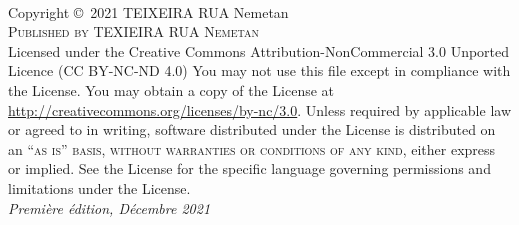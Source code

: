 \documentclass[11pt,fleqn]{book} %
\begin{document}

\begingroup
\thispagestyle{empty} %
\vfill
\endgroup


\newpage
~\vfill
\thispagestyle{empty}

\noindent Copyright \copyright\ 2021 TEIXEIRA RUA Nemetan\\ %

\noindent \textsc{Published by TEXIEIRA RUA Nemetan}\\ %


\noindent Licensed under the Creative Commons Attribution-NonCommercial 3.0 Unported Licence (CC BY-NC-ND 4.0) You may not use this file except in compliance with the License. You may obtain a copy of the License at \url{http://creativecommons.org/licenses/by-nc/3.0}. Unless required by applicable law or agreed to in writing, software distributed under the License is distributed on an \textsc{``as is'' basis, without warranties or conditions of any kind}, either express or implied. See the License for the specific language governing permissions and limitations under the License.\\ %

\noindent \textit{Première édition, Décembre 2021}\\ %
\end{document}
